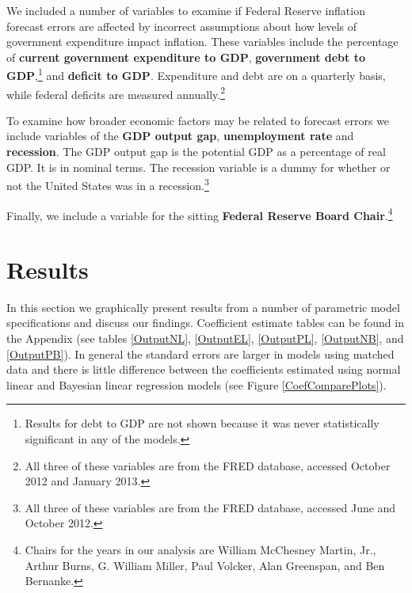 \documentclass[a4paper]{article}\usepackage{graphicx, color}
\begin{document}
We included a number of variables to examine if Federal Reserve inflation forecast errors are affected by incorrect assumptions about how levels of government expenditure impact inflation. These variables include the percentage of {\bf{current government expenditure to GDP}}, {\bf{government debt to GDP}},\footnote{Results for debt to GDP are not shown because it was never statistically significant in any of the models.} and \textbf{deficit to GDP}. Expenditure and debt are on a quarterly basis, while federal deficits are measured annually.\footnote{All three of these variables are from the FRED database, accessed October 2012 and January 2013.}

To examine how broader economic factors may be related to forecast errors we include variables of the {\bf{GDP output gap}}, {\bf{unemployment rate}} and {\bf{recession}}. The GDP output gap is the potential GDP as a percentage of real GDP. It is in nominal terms. The recession variable is a dummy for whether or not the United States was in a recession.\footnote{All three of these variables are from the FRED database, accessed June and October 2012.} 

Finally, we include a variable for the sitting {\bf{Federal Reserve Board Chair}}.\footnote{Chairs for the years in our analysis are William McChesney Martin, Jr., Arthur Burns, G. William Miller, Paul Volcker, Alan Greenspan, and Ben Bernanke.}

\section{Results}

In this section we graphically present results from a number of parametric model specifications and discuss our findings. Coefficient estimate tables can be found in the Appendix (see tables \ref{OutputNL}, \ref{OutputEL}, \ref{OutputPL}, \ref{OutputNB}, and \ref{OutputPB}). In general the standard errors are larger in models using matched data and there is little difference between the coefficients estimated using normal linear and Bayesian linear regression models (see Figure \ref{CoefComparePlots}). 
\end{document}
